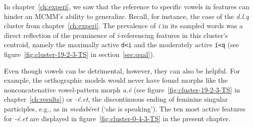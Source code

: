In chapter~\ref{ch:experi}, we saw that the reference to specific vowels in features can 
hinder an MCMM's ability to generalize. Recall, for instance, the case of the \textit{d.l.q} 
cluster from chapter~\ref{ch:experi}. The prevalence 
of \textit{i} in its sampled words was a direct reflection of the prominence of 
\textit{i}-referencing features in this cluster's centroid, namely the maximally 
active \texttt{d<i} and the moderately active \texttt{\'{i}<q} (see figure~\ref{fig:cluster-19-2-3-TS} in section~\ref{sec:qual}).

Even though vowels can be detrimental, however, they can also be helpful. For example, the orthographic models would never have found morphs like the nonconcatenative vowel-pattern morph \textit{a.\'{e}} (see figure~\ref{fig:cluster-19-2-3-TS} in chapter~\ref{ch:results}) or \textit{-\'{e}.et}, the discontinuous ending of  feminine singular participles, e.g., as in \textit{medab\'{e}ret} (`she is speaking'). The ten most active features for \textit{-\'{e}.et} are displayed in figure~\ref{fig:cluster-0-4-3-TS} in the present chapter.

